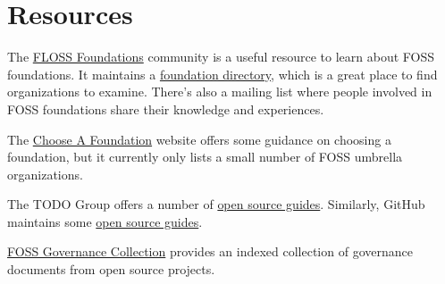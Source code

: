


\chapter{Resources}

The \href{https://flossfoundations.org/}{FLOSS Foundations} community is a useful resource to learn about FOSS foundations.  It maintains a \href{https://flossfoundations.org/foundation-directory/}{foundation directory}, which is a great place to find organizations to examine.  There's also a mailing list where people involved in FOSS foundations share their knowledge and experiences.

The \href{http://chooseafoundation.com/}{Choose A Foundation} website offers some guidance on choosing a foundation, but it currently only lists a small number of FOSS umbrella organizations.

The TODO Group offers a number of \href{https://todogroup.org/guides/}{open source guides}.  Similarly, GitHub maintains some \href{https://opensource.guide/}{open source guides}.

\href{https://fossgovernance.org/}{FOSS Governance Collection} provides an indexed collection of governance documents from open source projects.

